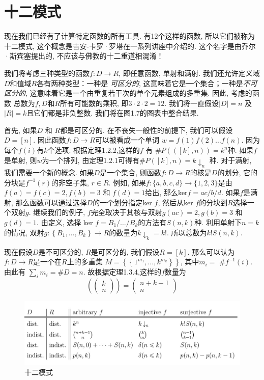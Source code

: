 \documentclass{ctexbook}
\begin{document}
\section{十二模式}
现在我们已经有了计算特定函数的所有工具. 有12个这样的函数, 所以它们被称为十二模式, 这个概念是吉安-卡罗·罗塔在一系列讲座中介绍的.
这个名字是由乔尔·斯宾塞提出的, 不应该与佛教的十二重道相混淆！

我们将考虑三种类型的函数$f: D \rightarrow R$, 即任意函数, 单射和满射. 我们还允许定义域$D$和值域$R$各有两种类型：一种是
\textsl{可区分的}, 这意味着它是一个集合；一种是\textsl{不可区分的}, 这意味着它是一个由重复若干次的单个元素组成的多重集. 因此, 考虑的函数
总数为$f, D$和$R$所有可能数的乘积, 即$3 \cdot 2 \cdot 2=12 $. 我们将一直假设$|D|=n$ 及 $|R|=k$且它们都是非负整数.
我们将在图1.7的图表中整合结果.

首先, 如果$D$ 和 $R$都是可区分的. 在不丧失一般性的前提下, 我们可以假设$D=[n]$. 因此函数$f: D \rightarrow R$可以被看成一个单词
$w=f(1) f(2) \ldots f(n) $. 因为每个$f(i)$有$k$个选项. 根据定理1.2.2,这样的$f$ 有 $\# P(([k], n))=k^{n} $种. 如果$f$
是单射, 则$w$为一个排列, 由定理1.2.1可得有$\# P([k], n)=k \downarrow_{n}$ 种. 对于满射, 我们需要一个新的概念.
如果$D$是一个集合, 则函数$f: D \rightarrow R$的核是$D$的划分, 它的分块是$f^{-1}(r)$的非空子集, $r \in R $. 例如,
如果$f:\{a, b, c, d\} \rightarrow\{1,2,3\}$是由$f(a)=f(c)=2, f(b)=3$ 和 $f(d)=1$给出, 那么ker$ f = a c / b / d$.
如果$f$是满射, 那么函数可以通过选择$D$的一个划分指定ker $f$, 然后从ker $f$的分块到$R$选择一个双射$g$. 继续我们的例子,
$f$完全取决于其核与双射$g(a c)=2, g(b)=3$ 和 $g(d)=1$. 由定义, 选择 ker $f=B_{1} / \ldots / B_{k}$的方法有$S(n, k)$种.
利用单射下$n=k$的情况, 双射$g:\left\{B_{1}, \ldots, B_{k}\right\} \rightarrow R$的数量为$k \downarrow_{k}=k !$.
所以总数为$k ! S(n, k)$.

现在假设$D$是不可区分的, $R$是可区分的, 我们假设$R=[k]$. 那么可以认为$f: D \rightarrow R$是一个在$R$上的多重集
$M=\left\{\left\{1^{m_{1}}, \ldots, k^{m_{k}}\right\}\right\}$, 其中$m_{i}=$ $\# f^{-1}(i)$.
由此有 $\sum_{i} m_{i}=\# D=n $. 故根据定理1.3.4,这样的$f$数量为
$$
\left(\left(\begin{array}{l}
k \\ n
\end{array}\right)\right)=\left(\begin{array}{c}
n+k-1 \\ n
\end{array}\right)
$$


\begin{figure}
    \centering
    \includegraphics[scale=0.3]{./fig1/figure1.7.PNG}
    \caption{十二模式}
\end{figure}
\end{document}
